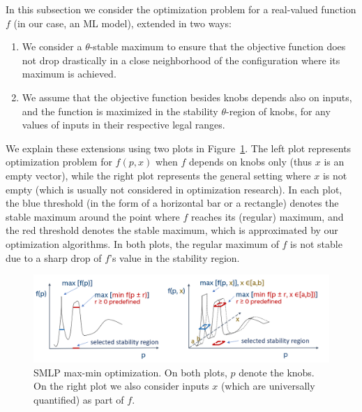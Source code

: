 \documentclass[a4paper,parskip=half]{article} %
\newcommand\changed[1]{{\color{blue}#1}}
\newcommand{\delete}[1]{}
\begin{document}
In this subsection we consider the optimization problem for a real-valued function $f$ (in our case, an ML model),
extended in two ways:
\begin{enumerate}
\item We consider a $\theta$-stable maximum to ensure that the objective function  does not drop drastically in a 
close neighborhood of the configuration where its maximum is achieved.
\item We assume that the objective function besides knobs depends also on inputs, and the %
function is maximized in the stability $\theta$-region of knobs, for any values of inputs in their respective legal ranges.
\end{enumerate}
We explain these extensions using two plots in Figure~\ref{smlp_maxmin}.
The left plot represents optimization problem for $f(p,x)$ when $f$ depends on knobs only (thus $x$ is an empty vector), 
while the right plot represents the general setting where $x$ is not empty (which is usually not considered in optimization research). 
In each plot, the blue threshold (in the form of a horizontal bar or a rectangle) denotes the stable maximum around the point 
where $f$ reaches its (regular) maximum, and the red threshold denotes the stable maximum, which is approximated by our 
optimization algorithms. In both plots, the regular maximum of $f$ is not stable due to a sharp drop of $f$'s value in the stability region. 
\delete{The right plot depicts the situation when input $x$ ranges in interval $[a, b]$, thus in \emph{max-min} optimization problem, 
formalized below in Formulas~\eqref{form:opt1}  and  \eqref{form:opt2}, the minimum of $f$ is calculated in the stability region 
of knobs $p$, with values of $x$ ranging in $[a,b]$.}

\begin{figure}[tp]
\center
\includegraphics[width= 0.7\columnwidth]{smlp_maxmin.PNG}
\caption{SMLP max-min optimization. On both plots, $p$ denote the knobs. On the right plot we also consider inputs $x$ 
(which are universally quantified) as part of $f$.} \label{smlp_maxmin}
\end{figure}
\end{document}
